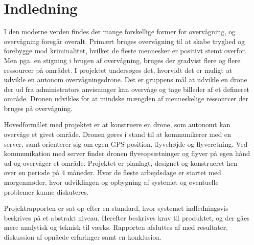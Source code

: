 \chapter{Indledning}
\label{chap:indledning}

I den moderne verden findes der mange forskellige former for overvågning, og overvågning foregår overalt. Primært bruges overvågning til at skabe tryghed og forebygge mod kriminalitet, hvilket de fleste mennesker er positivt stemt overfor. Men pga. en stigning i brugen af overvågning, bruges der gradvist flere og flere ressourcer på området. 
I projektet undersøges det, hvorvidt det er muligt at udvikle en autonom overvågningsdrone. Det er gruppens mål at udvikle en drone der ud fra administrators anvisninger kan overvåge og tage billeder af et defineret område. Dronen udvikles for at mindske mængden af menneskelige ressourcer der bruges på overvågning.

Hovedformålet med projektet er at konstruere en drone, som autonomt kan overvåge et givet område. Dronen gøres i stand til at kommunikerer med en server, samt orienterer sig om egen GPS position, flyvehøjde og flyveretning. Ved kommunikation med server finder dronen flyveopsætninger og flyver på egen hånd ud og overvåger et område.
Projektet er planlagt, designet og konstrueret hen over en periode på 4 måneder. Hvor de fleste arbejdsdage er startet med morgenmøder, hvor udviklingen og opbygning af systemet og eventuelle problemer kunne diskuteres. 

Projektrapporten er sat op efter en standard, hvor systemet indledningsvis beskrives på et abstrakt niveau. Herefter beskrives krav til produktet, og der gåes mere analytisk og teknisk til værks. Rapporten afsluttes af med resultater, diskussion af opnåede erfaringer samt en konklusion.


